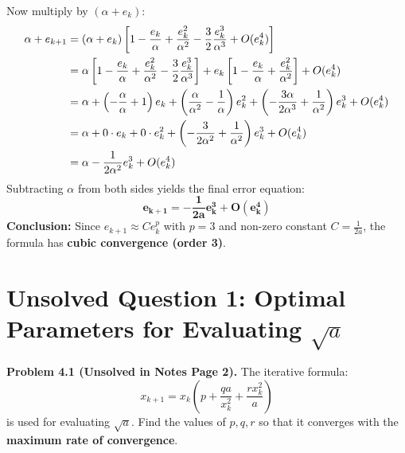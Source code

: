 \documentclass[11pt,a4paper]{article}
\numberwithin{equation}{section}
\begin{document}
\begin{solbox}
\begin{equation}
\end{equation}
Now multiply by $(\alpha + e_k)$:
\begin{align}
    \alpha + e_{k+1} &= (\alpha + e_k) \left[ 1 - \frac{e_k}{\alpha} + \frac{e_k^2}{\alpha^2} - \frac{3}{2}\frac{e_k^3}{\alpha^3} + O(e_k^4) \right] \notag \\
    &= \alpha \left[ 1 - \frac{e_k}{\alpha} + \frac{e_k^2}{\alpha^2} - \frac{3}{2}\frac{e_k^3}{\alpha^3} \right] + e_k \left[ 1 - \frac{e_k}{\alpha} + \frac{e_k^2}{\alpha^2} \right] + O(e_k^4) \notag \\
    &= \alpha + \left( -\frac{\alpha}{\alpha} + 1 \right) e_k + \left( \frac{\alpha}{\alpha^2} - \frac{1}{\alpha} \right) e_k^2 + \left( -\frac{3\alpha}{2\alpha^3} + \frac{1}{\alpha^2} \right) e_k^3 + O(e_k^4) \notag \\
    &= \alpha + 0 \cdot e_k + 0 \cdot e_k^2 + \left( -\frac{3}{2\alpha^2} + \frac{1}{\alpha^2} \right) e_k^3 + O(e_k^4) \notag \\
    &= \alpha - \frac{1}{2\alpha^2} e_k^3 + O(e_k^4)
\end{align}
Subtracting $\alpha$ from both sides yields the final error equation:
\begin{equation}
    \mathbf{e_{k+1} = -\frac{1}{2a} e_k^3 + O(e_k^4)}
\end{equation}
\textbf{Conclusion:} Since $e_{k+1} \approx C e_k^p$ with $p = 3$ and non-zero constant $C = \frac{1}{2a}$, the formula has \textbf{cubic convergence (order 3)}.
\end{solbox}

\section{Unsolved Question 1: Optimal Parameters for Evaluating \texorpdfstring{$\sqrt{a}$}{sqrt(a)}}

\begin{thmbox}
\textbf{Problem 4.1 (Unsolved in Notes Page 2).}
The iterative formula:
\begin{equation}
    x_{k+1} = x_k \left( p + \frac{qa}{x_k^2} + \frac{r x_k^2}{a} \right)
\end{equation}
is used for evaluating $\sqrt{a}$. Find the values of $p, q, r$ so that it converges with the \textbf{maximum rate of convergence}.
\end{thmbox}
\end{document}
